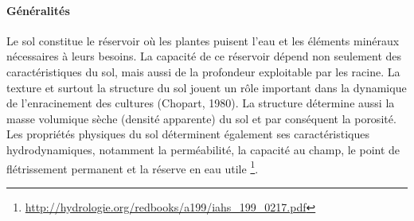 \documentclass[a4paper,11pt]{article}
\begin{document}
\paragraph{Généralités}

Le sol constitue le réservoir où les plantes puisent l’eau et les
éléments minéraux nécessaires à leurs besoins. La capacité de ce
réservoir dépend non seulement des caractéristiques du sol, mais aussi
de la profondeur exploitable par les racine. La texture et surtout la
structure du sol jouent un rôle important dans la dynamique de
l’enracinement des cultures (Chopart, 1980). La structure détermine
aussi la masse volumique sèche (densité apparente) du sol et par
conséquent la porosité. Les propriétés physiques du sol déterminent
également ses caractéristiques hydrodynamiques, notamment la
perméabilité, la capacité au champ, le point de flétrissement
permanent et la réserve en eau utile
\footnote{\url{http://hydrologie.org/redbooks/a199/iahs_199_0217.pdf}}.



\end{document}

